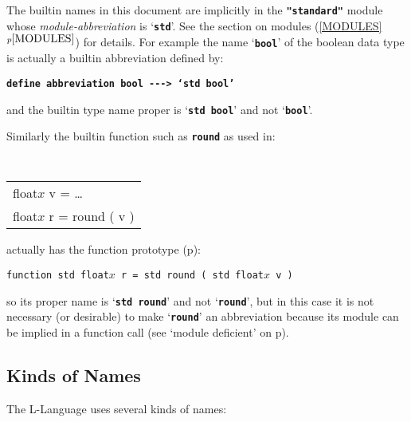 \documentclass[12pt]{article}
\newcommand{\TT}[1]{{\tt \bfseries #1}}
\newcommand{\itemref}[1]{\ref{#1}$^{p\pageref{#1}}$}
\newcommand{\pagref}[1]{p\pageref{#1}}
\newcommand{\ABV}{-{}-{}->}		%
\begin{document}
The builtin names in this document are implicitly in the
\TT{"standard"} module whose {\em module-abbreviation} is `\TT{std}'.
See the section on modules (\itemref{MODULES}) for details.
For example the name `\TT{bool}' of the boolean data type is actually a builtin
abbreviation defined by:
\begin{center}
\TT{define abbreviation bool {\ABV} `std bool'}
\end{center}
and the builtin type name proper is `\TT{std bool}' and not `\TT{bool}'.


Similarly the  builtin function such as \TT{round} as used in:
\begin{center} \tt
\begin{tabular}{l}
float$x$ v = \ldots{} \\
float$x$ r = round ( v ) \\
\end{tabular}
\end{center}
actually has the function prototype (\pagref{FUNCTION-PROTOTYPE}):
\begin{center}
{\tt function std float$x$ r = std round ( std float$x$ v )} \\
\end{center}
so its proper name is `\TT{std round}' and not `\TT{round}',
but in this case it is not necessary (or desirable) to make `\TT{round}'
an abbreviation because its module can be implied in a function call
(see `module deficient' on \pagref{MODULE-DEFICIENT}).

\subsection{Kinds of Names}
\label{KINDS-OF-NAMES}

The L-Language uses several kinds of names:
\end{document}
